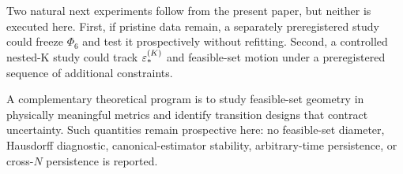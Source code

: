 Two natural next experiments follow from the present paper, but neither is executed here.  First, if pristine data remain, a separately preregistered study could freeze $\Phi_6$ and test it prospectively without refitting.  Second, a controlled nested-K study could track $\varepsilon_*^{(K)}$ and feasible-set motion under a preregistered sequence of additional constraints.

A complementary theoretical program is to study feasible-set geometry in physically meaningful metrics and identify transition designs that contract uncertainty.  Such quantities remain prospective here: no feasible-set diameter, Hausdorff diagnostic, canonical-estimator stability, arbitrary-time persistence, or cross-$N$ persistence is reported.
